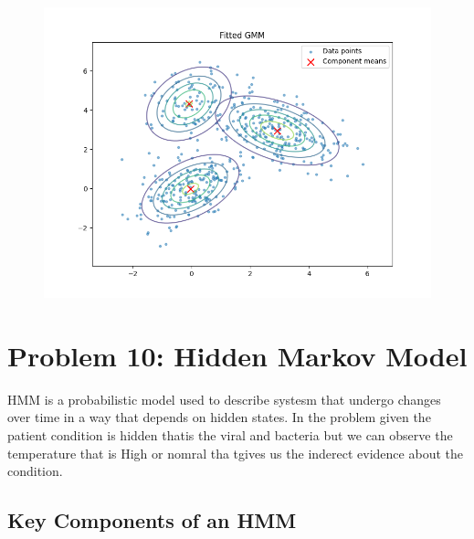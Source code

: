 \documentclass{article}
\begin{document}
\begin{figure}[H]
\centering
\includegraphics[width=1\textwidth]{fitted GMM visual.png}
\label{fig:gmm_visual}
\end{figure}

\clearpage

\section*{Problem 10: Hidden Markov Model}
HMM is a probabilistic model used to describe systesm that undergo changes over time in a way that depends on hidden states. In the problem given the patient condition is
hidden thatis the viral and bacteria but we can observe the temperature that is High or nomral tha tgives us the inderect evidence about the condition.

\subsection*{Key Components of an HMM}
\end{document}
